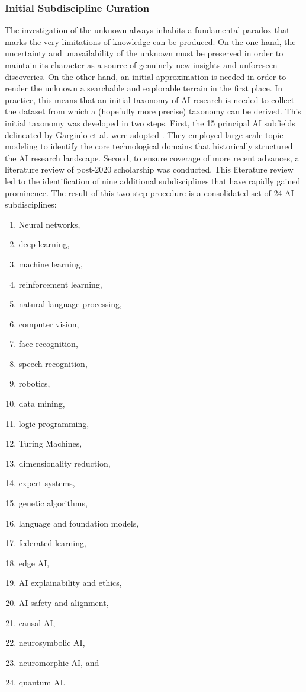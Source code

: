 \documentclass{article}
\begin{document}
	\subsubsection{Initial Subdiscipline Curation}
	
	The investigation of the unknown always inhabits a fundamental paradox that marks the very limitations of knowledge can be produced. On the one hand, the uncertainty and unavailability of the unknown must be preserved in order to maintain its character as a source of genuinely new insights and unforeseen discoveries. On the other hand, an initial approximation is needed in order to render the unknown a searchable and explorable terrain in the first place. In practice, this means that an initial taxonomy of AI research is needed to collect the dataset from which a (hopefully more precise) taxonomy can be derived. This initial taxonomy was developed in two steps. First, the 15 principal AI subfields delineated by Gargiulo et al. were adopted \cite{gargiulo2022cartography}. They employed large-scale topic modeling to identify the core technological domains that historically structured the AI research landscape. Second, to ensure coverage of more recent advances, a literature review of post-2020 scholarship was conducted. This literature review led to the identification of nine additional subdisciplines that have rapidly gained prominence. The result of this two-step procedure is a consolidated set of 24 AI subdisciplines:
	
	\begin{enumerate}[(1)]
		\item Neural networks,
		\item deep learning,
		\item machine learning,
		\item reinforcement learning,
		\item natural language processing,
		\item computer vision,
		\item face recognition,
		\item speech recognition,
		\item robotics,
		\item data mining,
		\item logic programming,
		\item Turing Machines,
		\item dimensionality reduction,
		\item expert systems,
		\item genetic algorithms,
		\item language and foundation models,
		\item federated learning,
		\item edge AI,
		\item AI explainability and ethics,
		\item AI safety and alignment,
		\item causal AI,
		\item neurosymbolic AI,
		\item neuromorphic AI, and
		\item quantum AI.
	\end{enumerate}
	
\end{document}
